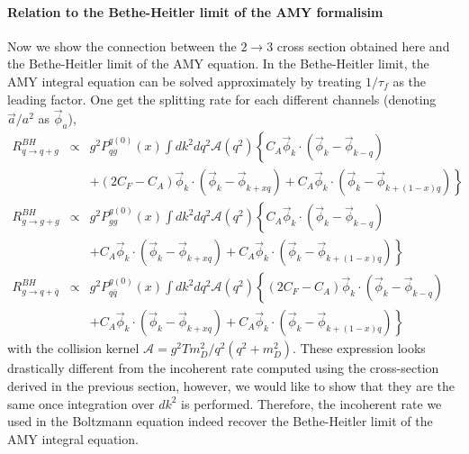 \paragraph*{Relation to the Bethe-Heitler limit of the AMY formalisim}
Now we show the connection between the $2\rightarrow 3$ cross section obtained here and the Bethe-Heitler limit of the AMY equation.
In the Bethe-Heitler limit, the AMY integral equation can be solved approximately by treating $1/\tau_f$ as the leading factor. 
One get the splitting rate for each different channels (denoting $\vec{a}/a^2$ as $\vec{\phi}_{a}$), 
\begin{eqnarray}
R_{q\rightarrow q+g}^{BH} &\propto& g^2 P_{qg}^{q(0)}(x) \int d k^2 d q^2 \mathcal{A}(q^2) \left\{
C_A\vec{\phi}_k\cdot\left(\vec{\phi}_k-\vec{\phi}_{k-q}\right) \right.\\\nonumber
&&+\left. (2C_F-C_A) \vec{\phi}_k\cdot\left(\vec{\phi}_k-\vec{\phi}_{k+xq}\right)
+ C_A \vec{\phi}_k\cdot\left(\vec{\phi}_k - \vec{\phi}_{k+(1-x)q}\right)
\right\}
\\
R_{g\rightarrow g+g}^{BH} &\propto& g^2 P_{gg}^{g(0)}(x) \int d k^2 d q^2 \mathcal{A}(q^2) \left\{
C_A\vec{\phi}_k\cdot\left(\vec{\phi}_k-\vec{\phi}_{k-q}\right) \right.\\\nonumber
&&+\left. C_A \vec{\phi}_k\cdot\left(\vec{\phi}_k-\vec{\phi}_{k+xq}\right)
+ C_A \vec{\phi}_k\cdot\left(\vec{\phi}_k - \vec{\phi}_{k+(1-x)q}\right)
\right\}
\\
R_{g\rightarrow q+\bar{q}}^{BH} &\propto& g^2 P_{q\bar{q}}^{g(0)}(x) \int d k^2  d q^2 \mathcal{A}(q^2) \left\{
(2C_F-C_A)\vec{\phi}_k\cdot\left(\vec{\phi}_k-\vec{\phi}_{k-q}\right) \right.\\\nonumber
&&+\left. C_A \vec{\phi}_k\cdot\left(\vec{\phi}_k-\vec{\phi}_{k+xq}\right)
+ C_A \vec{\phi}_k\cdot\left(\vec{\phi}_k - \vec{\phi}_{k+(1-x)q}\right)
\right\}
\end{eqnarray}
with the collision kernel $\mathcal{A} = g^2 T m_D^2/q^2(q^2+m_D^2)$. These expression looks drastically different from the incoherent rate computed using the cross-section derived in the previous section, however, we would like to show that they are the same once integration over $dk^2$ is performed.
Therefore, the incoherent rate we used in the Boltzmann equation indeed recover the Bethe-Heitler limit of the AMY integral equation.


